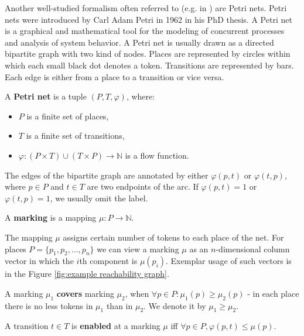 Another well-studied formalism often referred to (e.g. in \cite{Dang04Sequential,Freund:2004:Async}) are Petri nets. Petri nets \cite{Petri62,Yen06PetriNets,Hack:1976:DQP:889753} were introduced by Carl Adam Petri in 1962 in his PhD thesis. A Petri net is a graphical and mathematical tool for the modeling of concurrent processes and analysis of system behavior. A Petri net is usually drawn as a directed bipartite graph with two kind of nodes. Places are represented by circles within which each small black dot denotes a token. Transitions are represented by bars. Each edge is either from a place to a transition or vice versa.

\begin{definition}
  A  {\bf Petri net} is a tuple $(P, T, \varphi)$, where:
  \begin{itemize}
    \item $P$ is a finite set of places,
    \item $T$ is a finite set of transitions,
    \item $\varphi: (P\times T)\cup(T\times P)\rightarrow \mathbb N$ is a flow function.
  \end{itemize}
\end{definition}

The edges of the bipartite graph are annotated by either $\varphi(p,t)$ or $\varphi(t,p)$, where $p\in P$ and $t\in T$ are two endpoints of the arc. If $\varphi(p,t)=1$ or $\varphi(t,p)=1$, we usually omit the label.

\begin{definition}
  A {\bf marking} is a mapping $\mu: P\rightarrow \mathbb N$.
\end{definition}

The mapping $\mu$ assigns certain number of tokens to each place of the net. For places $P=\{p_1, p_2, \dots, p_n\}$ we can view a marking $\mu$ as an $n$-dimensional column vector in which the $i$th component is $\mu(p_i)$. Exemplar usage of such vectors is in the Figure \ref{fig:example reachability graph}.

\begin{definition}
  A marking $\mu_1$ {\bf covers} marking $\mu_2$, when $\forall p\in P: \mu_1(p)\geq\mu_2(p)$ - in each place there is no less tokens in $\mu_1$ than in $\mu_2$. We denote it by $\mu_1\geq\mu_2$.
\end{definition} 

\begin{definition}
  A transition $t\in T$ is {\bf enabled} at a marking $\mu$ iff $\forall p\in P, \varphi(p,t)\leq\mu(p)$.
\end{definition}

